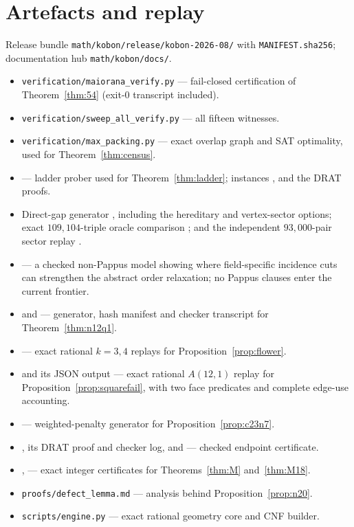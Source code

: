 \documentclass[11pt]{article}
\theoremstyle{definition}
\begin{document}
\appendix
\section{Artefacts and replay}\label{app:artifacts}

Release bundle \texttt{math/kobon/release/kobon-2026-08/} with
\texttt{MANIFEST.sha256}; documentation hub \texttt{math/kobon/docs/}.

\begin{itemize}
\item \texttt{verification/maiorana\_verify.py} --- fail-closed certification
of Theorem~\ref{thm:54} (exit-$0$ transcript included).
\item \texttt{verification/sweep\_all\_verify.py} --- all fifteen witnesses.
\item \texttt{verification/max\_packing.py} --- exact overlap graph and SAT
optimality, used for Theorem~\ref{thm:census}.
\item {} --- ladder prober used for
Theorem~\ref{thm:ladder}; instances ,
 and the DRAT proofs.
\item Direct-gap generator , including the hereditary and
vertex-sector options; exact $109{,}104$-triple oracle comparison
; and the independent $93{,}000$-pair sector replay
.
\item {} --- a checked
non-Pappus model showing where field-specific incidence cuts can strengthen
the abstract order relaxation; no Pappus clauses enter the current frontier.
\item {} and
 --- generator, hash manifest and
checker transcript for Theorem~\ref{thm:n12q1}.
\item {} --- exact rational
$k=3,4$ replays for Proposition~\ref{prop:flower}.
\item {} and its JSON
output --- exact rational $A(12,1)$ replay for
Proposition~\ref{prop:squarefail}, with two face predicates and complete
edge-use accounting.
\item {} --- weighted-penalty
generator for Proposition~\ref{prop:c23n7}.
\item {}, its DRAT proof and checker log, and
 --- checked endpoint certificate.
\item {},
 --- exact integer certificates for
Theorems~\ref{thm:M} and~\ref{thm:M18}.
\item \texttt{proofs/defect\_lemma.md} --- analysis behind
Proposition~\ref{prop:n20}.
\item \texttt{scripts/engine.py} --- exact rational geometry core and CNF
builder.
\end{itemize}
\end{document}

